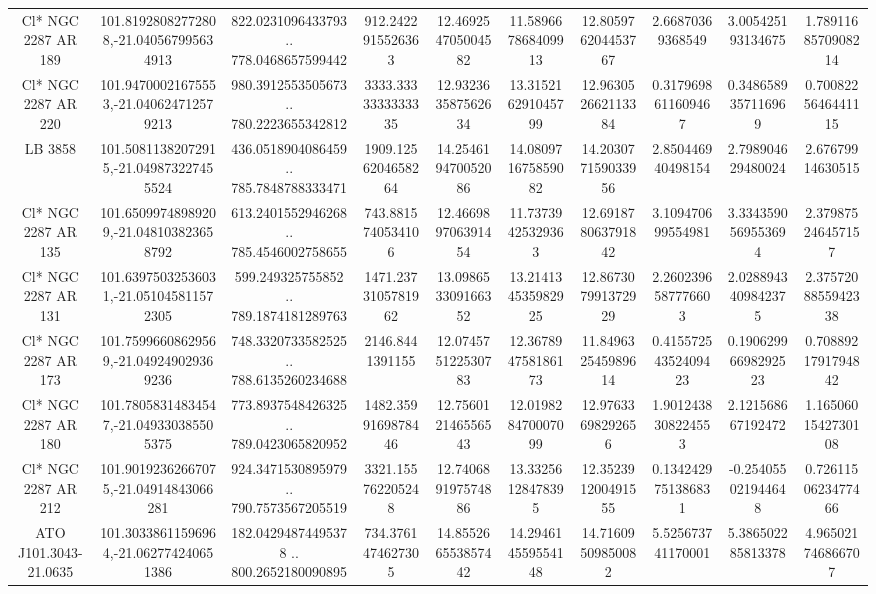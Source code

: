 \begin{table}
\begin{tabular}{cccccccccc}
Cl* NGC 2287     AR     189 & 101.81928082772808,-21.040567995634913 & 822.0231096433793 .. 778.0468657599442 & 912.2422915526363 & 12.469254705004582 & 11.589667868409913 & 12.805976204453767 & 2.66870369368549 & 3.005425193134675 & 1.7891168570908214 \\
Cl* NGC 2287     AR     220 & 101.94700021675553,-21.040624712579213 & 980.3912553505673 .. 780.2223655342812 & 3333.3333333333335 & 12.932363587562634 & 13.315216291045799 & 12.963052662113384 & 0.3179698611609467 & 0.3486589357116969 & 0.7008225646441115 \\
LB  3858 & 101.50811382072915,-21.049873227455524 & 436.0518904086459 .. 785.7848788333471 & 1909.1256204658264 & 14.254619470052086 & 14.080971675859082 & 14.203077159033956 & 2.850446940498154 & 2.798904629480024 & 2.67679914630515 \\
Cl* NGC 2287     AR     135 & 101.65099748989209,-21.048103823658792 & 613.2401552946268 .. 785.4546002758655 & 743.8815740534106 & 12.466989706391454 & 11.73739425329363 & 12.691878063791842 & 3.109470699554981 & 3.3343590569553694 & 2.379875246457157 \\
Cl* NGC 2287     AR     131 & 101.63975032536031,-21.051045811572305 & 599.249325755852 .. 789.1874181289763 & 1471.2373105781962 & 13.098653309166352 & 13.214134535982925 & 12.867307991372929 & 2.2602396587776603 & 2.0288943409842375 & 2.3757208855942338 \\
Cl* NGC 2287     AR     173 & 101.75996608629569,-21.049249029369236 & 748.3320733582525 .. 788.6135260234688 & 2146.8441391155 & 12.074575122530783 & 12.367894758186173 & 11.849632545989614 & 0.41557254352409423 & 0.19062996698292523 & 0.7088921791794842 \\
Cl* NGC 2287     AR     180 & 101.78058314834547,-21.049330385505375 & 773.8937548426325 .. 789.0423065820952 & 1482.3599169878446 & 12.756012146556543 & 12.019828470007099 & 12.97633698292656 & 1.9012438308224553 & 2.121568667192472 & 1.1650601542730108 \\
Cl* NGC 2287     AR     212 & 101.90192362667075,-21.04914843066281 & 924.3471530895979 .. 790.7573567205519 & 3321.155762205248 & 12.740689197574886 & 13.33256128478395 & 12.352391200491555 & 0.1342429751386831 & -0.254055021944648 & 0.7261150623477466 \\
ATO J101.3043-21.0635 & 101.30338611596964,-21.062774240651386 & 182.04294874495378 .. 800.2652180090895 & 734.3761474627305 & 14.855266553857442 & 14.294614559554148 & 14.71609509850082 & 5.525673741170001 & 5.386502285813378 & 4.965021746866707 \\

\end{tabular}
\end{table}

